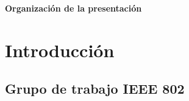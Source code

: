 \documentclass[aspectratio=169]{beamer}
\begin{document}

\begin{frame}{\textbf{Organización de la presentación}}
  \tableofcontents
\end{frame}
%
%

\section{Introducción}

\subsection[IEEE 802]{Grupo de trabajo IEEE 802}
\end{document}
